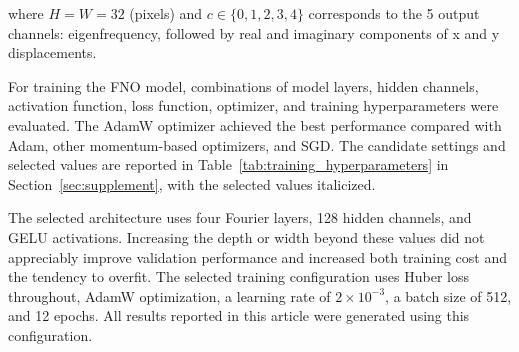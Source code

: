 \documentclass[preprint,review,12pt,numafflabel]{elsarticle}
\begin{document}
where $H = W = 32$ (pixels) and $c \in \{0,1,2,3,4\}$ corresponds to the 5 output channels: eigenfrequency, followed by real and imaginary components of x and y displacements.

For training the FNO model, combinations of model layers, hidden channels, activation function, loss function, optimizer, and training hyperparameters were evaluated. The AdamW optimizer achieved the best performance compared with Adam, other momentum-based optimizers, and SGD. The candidate settings and selected values are reported in Table~\ref{tab:training_hyperparameters} in Section~\ref{sec:supplement}, with the selected values italicized.




The selected architecture uses four Fourier layers, 128 hidden channels, and GELU activations. Increasing the depth or width beyond these values did not appreciably improve validation performance and increased both training cost and the tendency to overfit. The selected training configuration uses Huber loss throughout, AdamW optimization, a learning rate of $2\times10^{-3}$, a batch size of 512, and 12 epochs. All results reported in this article were generated using this configuration.
\end{document}
